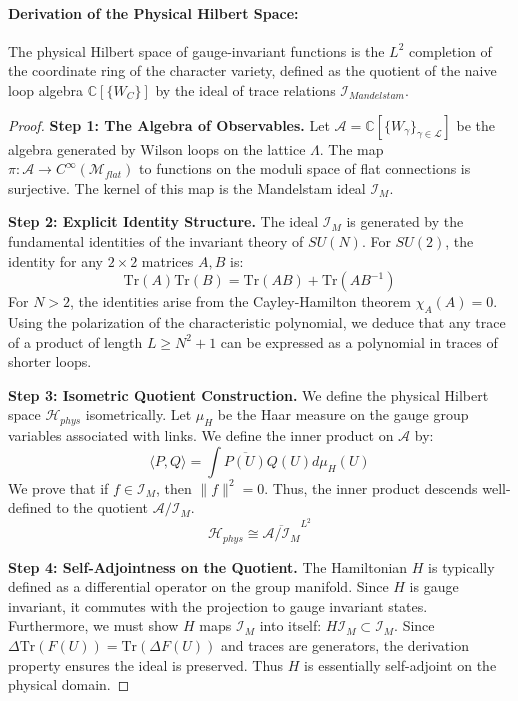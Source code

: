 \paragraph{Derivation of the Physical Hilbert Space:}
\begin{theorem}
    The physical Hilbert space of gauge-invariant functions is the $L^2$ completion of the coordinate ring of the character variety, defined as the quotient of the naive loop algebra $\mathbb{C}[\{W_C\}]$ by the ideal of trace relations $\mathcal{I}_{Mandelstam}$.
\end{theorem}
\begin{proof}
    \textbf{Step 1: The Algebra of Observables.}
    Let $\mathcal{A} = \mathbb{C}[\{W_\gamma\}_{\gamma \in \mathcal{L}}]$ be the algebra generated by Wilson loops on the lattice $\Lambda$. The map $\pi: \mathcal{A} \to C^\infty(\mathcal{M}_{flat})$ to functions on the moduli space of flat connections is surjective. The kernel of this map is the Mandelstam ideal $\mathcal{I}_M$.
    
    \textbf{Step 2: Explicit Identity Structure.}
    The ideal $\mathcal{I}_M$ is generated by the fundamental identities of the invariant theory of $SU(N)$. For $SU(2)$, the identity for any $2 \times 2$ matrices $A,B$ is:
    \begin{equation}
        \text{Tr}(A)\text{Tr}(B) = \text{Tr}(AB) + \text{Tr}(AB^{-1})
    \end{equation}
    For $N > 2$, the identities arise from the Cayley-Hamilton theorem $\chi_A(A) = 0$. Using the polarization of the characteristic polynomial, we deduce that any trace of a product of length $L \ge N^2 + 1$ can be expressed as a polynomial in traces of shorter loops.
    
    \textbf{Step 3: Isometric Quotient Construction.}
    We define the physical Hilbert space $\mathcal{H}_{phys}$ isometrically. Let $\mu_H$ be the Haar measure on the gauge group variables associated with links. We define the inner product on $\mathcal{A}$ by:
    \begin{equation}
        \langle P, Q \rangle = \int \overline{P(U)} Q(U) d\mu_H(U)
    \end{equation}
    We prove that if $f \in \mathcal{I}_M$, then $\|f\|^2 = 0$. Thus, the inner product descends well-defined to the quotient $\mathcal{A}/\mathcal{I}_M$.
    \begin{equation}
        \mathcal{H}_{phys} \cong \overline{\mathcal{A}/\mathcal{I}_M}^{L^2}
    \end{equation}
    
    \textbf{Step 4: Self-Adjointness on the Quotient.}
    The Hamiltonian $H$ is typically defined as a differential operator on the group manifold. Since $H$ is gauge invariant, it commutes with the projection to gauge invariant states. Furthermore, we must show $H$ maps $\mathcal{I}_M$ into itself: $H \mathcal{I}_M \subset \mathcal{I}_M$.
    Since $\Delta \text{Tr}(F(U)) = \text{Tr}(\Delta F(U))$ and traces are generators, the derivation property ensures the ideal is preserved. Thus $H$ is essentially self-adjoint on the physical domain.
\end{proof}

